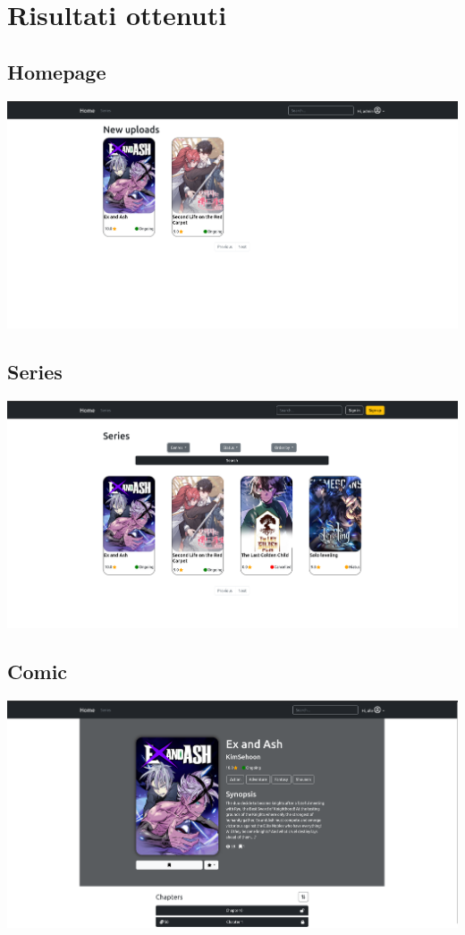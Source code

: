 \section{Risultati ottenuti}

\subsection{Homepage}
\includegraphics[width=1.0\linewidth]{images/homepage.png}

\subsection{Series}
\includegraphics[width=1.0\linewidth]{images/comic-list.png}

\subsection{Comic}
\includegraphics[width=1.0\linewidth]{images/comic-detail.png}

